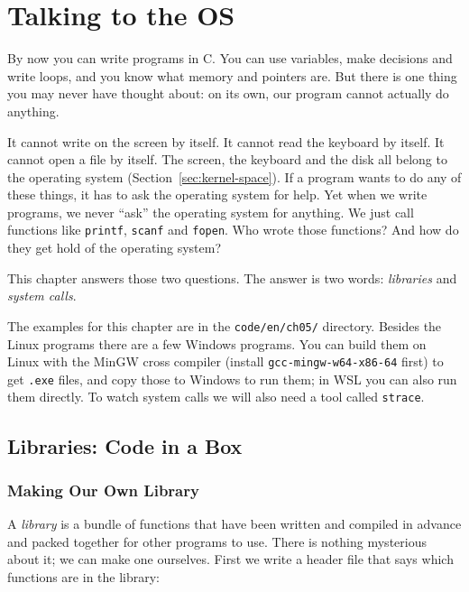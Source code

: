 \chapter{Talking to the OS}
\label{chap:os}

By now you can write programs in C. You can use variables, make decisions and write loops, and you know what memory and pointers are. But there is one thing you may never have thought about: on its own, our program cannot actually do anything.

It cannot write on the screen by itself. It cannot read the keyboard by itself. It cannot open a file by itself. The screen, the keyboard and the disk all belong to the operating system (Section~\ref{sec:kernel-space}). If a program wants to do any of these things, it has to ask the operating system for help. Yet when we write programs, we never ``ask'' the operating system for anything. We just call functions like \texttt{printf}, \texttt{scanf} and \texttt{fopen}. Who wrote those functions? And how do they get hold of the operating system?

This chapter answers those two questions. The answer is two words: \emph{libraries} and \emph{system calls}.

The examples for this chapter are in the \texttt{code/en/ch05/} directory. Besides the Linux programs there are a few Windows programs. You can build them on Linux with the MinGW cross compiler (install \texttt{gcc-mingw-w64-x86-64} first) to get \texttt{.exe} files, and copy those to Windows to run them; in WSL you can also run them directly. To watch system calls we will also need a tool called \texttt{strace}.

\section{Libraries: Code in a Box}
\label{sec:library}

\subsection{Making Our Own Library}

A \emph{library} is a bundle of functions that have been written and compiled in advance and packed together for other programs to use. There is nothing mysterious about it; we can make one ourselves. First we write a header file that says which functions are in the library:

